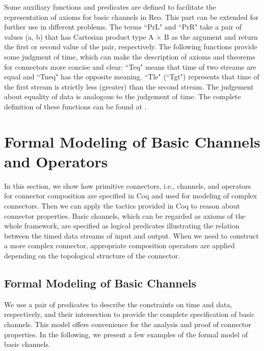 \documentclass[preprint,3p]{elsarticle}
\begin{document}
Some auxiliary functions and predicates are defined to facilitate the representation of axioms for basic channels in Reo. This part can be extended for further use in different problems.
The terms ``PrL" and ``PrR" take a pair of values (a, b) that has Cartesian product type A $\times$ B as the argument and return the first or second value of the pair, respectively.
The following functions provide some judgment of time, which can make
the description of axioms and theorems for connectors more concise and
clear: ``Teq" means that time of two streams are equal and ``Tneq" has the
opposite meaning. ``Tle"  (``Tgt") represents that time of the first stream is
strictly less (greater) than the second stream. The judgement about
equality of data is analogous to the judgement of time. The complete
definition of these functions can be found at \cite{reo2coq2Z3}.


\section{Formal Modeling of Basic Channels and Operators}\label{sec:channelandoperator}
In this section, we show how primitive connectors, i.e., channels, and operators for connector composition are specified in Coq and used for modeling of complex connectors. Then we can apply the tactics provided in Coq to reason about connector properties. Basic channels, which can be regarded as axioms of the whole framework, are specified as logical predicates illustrating the relation between the timed data streams of input and output. When we need to construct a more complex connector, appropriate composition operators are applied depending on the topological structure of the connector.

\subsection{Formal Modeling of Basic Channels}

We use a pair of predicates to describe the constraints on time and data, respectively, and their intersection to provide the complete specification of basic channels. This model offers convenience for the analysis and proof of connector properties. In the following, we present a few examples of the formal model of basic channels.
\end{document}
